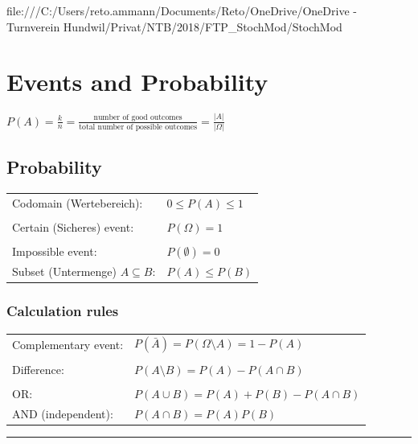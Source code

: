 
file:///C:/Users/reto.ammann/Documents/Reto/OneDrive/OneDrive - Turnverein Hundwil/Privat/NTB/2018/FTP_StochMod/StochMod\section{Events and Probability}
$P(A)=\frac{k}{n}=\frac{\text{number of good outcomes}}{\text{total number of possible outcomes}}=\frac{|A|}{|\Omega|}$\\

\vspace{5mm}
 
	\begin{minipage}{8cm}
	\subsection{Probability }
		\begin{tabular}{ll}
			Codomain (Wertebereich):
			& ${0}\le{P(A)}\le{1}$\\ \\
			Certain (Sicheres) event:
			& $P(\Omega)=1$\\ \\
			Impossible event:
			& $P(\emptyset)=0$\\
			Subset (Untermenge) $A\subseteq B$: & $P(A)\leq P(B)$
		\end{tabular}
	\end{minipage}
		\begin{minipage}{11.2cm}
		\subsubsection{Calculation rules}
			\begin{tabular}{ll}
				Complementary event: &$P(\bar{A})=P({\Omega}\setminus{A})=1-P(A)$\\ \\
				Difference: &$P({A}\setminus{B})=P(A)-P({A}\cap{B})$\\ \\
				OR: &$P({A}\cup{B})=P(A)+P(B)-P({A}\cap{B})$\\
				AND (independent): & $P(A\cap B)=P(A)P(B)$
				
			\end{tabular}
		\end{minipage}
		\newline
		
\vspace{2mm}
\hrule

\vspace{3mm}



